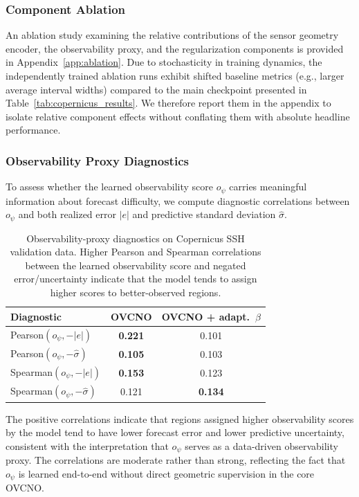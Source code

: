 \documentclass[11pt,a4paper]{article}
\begin{document}
\subsubsection{Component Ablation}

An ablation study examining the relative contributions of the sensor geometry encoder, the observability proxy, and the regularization components is provided in Appendix~\ref{app:ablation}. Due to stochasticity in training dynamics, the independently trained ablation runs exhibit shifted baseline metrics (e.g., larger average interval widths) compared to the main checkpoint presented in Table~\ref{tab:copernicus_results}. We therefore report them in the appendix to isolate relative component effects without conflating them with absolute headline performance.

\subsubsection{Observability Proxy Diagnostics}

To assess whether the learned observability score $o_\psi$ carries meaningful information about forecast difficulty, we compute diagnostic correlations between $o_\psi$ and both realized error $|e|$ and predictive standard deviation $\hat{\sigma}$.

\begin{table}[!htbp]
\centering
\caption{Observability-proxy diagnostics on Copernicus SSH validation data. Higher Pearson and Spearman correlations between the learned observability score and negated error/uncertainty indicate that the model tends to assign higher scores to better-observed regions.}
\label{tab:obs_diagnostics}
\vspace{4pt}
\begin{tabular}{@{}l c c@{}}
\toprule
\textbf{Diagnostic} & \textbf{OVCNO} & \textbf{OVCNO + adapt.~$\beta$} \\
\midrule
Pearson$(o_\psi, -|e|)$ & \textbf{0.221} & 0.101 \\
Pearson$(o_\psi, -\hat{\sigma})$ & \textbf{0.105} & 0.103 \\
Spearman$(o_\psi, -|e|)$ & \textbf{0.153} & 0.123 \\
Spearman$(o_\psi, -\hat{\sigma})$ & 0.121 & \textbf{0.134} \\
\bottomrule
\end{tabular}
\end{table}

The positive correlations indicate that regions assigned higher observability scores by the model tend to have lower forecast error and lower predictive uncertainty, consistent with the interpretation that $o_\psi$ serves as a data-driven observability proxy. The correlations are moderate rather than strong, reflecting the fact that $o_\psi$ is learned end-to-end without direct geometric supervision in the core OVCNO.
\end{document}
